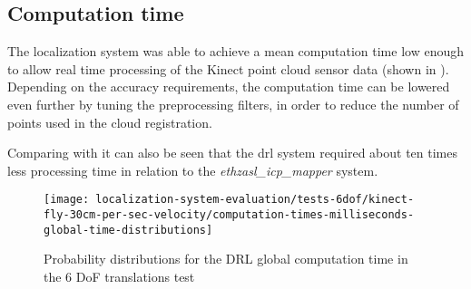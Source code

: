%
%



\subsection{Computation time}

The localization system was able to achieve a mean computation time low enough to allow real time processing of the Kinect point cloud sensor data (shown in ). Depending on the accuracy requirements, the computation time can be lowered even further by tuning the preprocessing filters, in order to reduce the number of points used in the cloud registration.

Comparing  with  it can also be seen that the \gls{drl} system required about ten times less processing time in relation to the \emph{ethzasl\_icp\_mapper} system.


\begin{figure}[H]
	\centering
	\texttt{[image: localization-system-evaluation/tests-6dof/kinect-fly-30cm-per-sec-velocity/computation-times-milliseconds-global-time-distributions]}
	\caption{Probability distributions for the DRL global computation time in the 6 DoF translations test}
	\label{fig:localization-system-evaluation_kinect-fly-30cm-per-sec-velocity-computation-time}
\end{figure}

